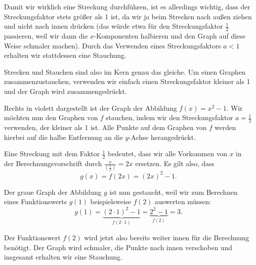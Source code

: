 \documentclass[../../main.tex]{subfiles}
\begin{document}
Damit wir wirklich eine Streckung durchführen, ist es allerdings wichtig, dass der Streckungsfaktor stets größer als 1 ist, da wir ja beim Strecken nach außen ziehen und nicht nach innen drücken (das würde etwa für den Streckungsfaktor $\frac{1}{2}$ passieren, weil wir dann die $x$-Komponenten halbieren und den Graph auf diese Weise schmaler machen). Durch das Verwenden eines Streckungsfaktors $a<1$ erhalten wir stattdessen eine Stauchung.

Strecken und Stauchen sind also im Kern genau das gleiche. Um einen Graphen zusammenzustauchen, verwenden wir einfach einen Streckungsfaktor kleiner als 1 und der Graph wird zusammengedrückt.

\begin{example}
    Rechts in violett dargestellt ist der Graph der Abbildung $f(x)=x^2-1$.
    Wir möchten nun den Graphen von $f$ stauchen, indem wir den Streckungsfaktor $a=\frac{1}{2}$ verwenden, der kleiner als 1 ist. Alle Punkte auf dem Graphen von $f$ werden hierbei auf die halbe Entfernung an die $y$-Achse herangedrückt. 
    
    Eine Streckung mit dem Faktor $\frac{1}{2}$ bedeutet, dass wir alle Vorkommen von $x$ in der Berechnungsvorschrift durch $\frac{x}{(\frac{1}{2})}=2x$ ersetzen. Es gilt also, dass \[g(x) = f(2x) = (2x)^2 - 1.\]
    
    Der graue Graph der Abbildung $g$ ist nun gestaucht, weil wir zum Berechnen eines Funktionswerts $g(1)$ beispielsweise $f(2)$ auswerten müssen: \[g(1)=\underbrace{(2\cdot 1)^2-1}_{f(2\cdot 1)}=\underbrace{2^2-1}_{f(2)}=3.\]
    
    Der Funktionswert $f(2)$ wird jetzt also bereits weiter innen für die Berechnung benötigt. Der Graph wird schmaler, die Punkte nach innen verschoben und insgesamt erhalten wir eine Stauchung.
\end{example}
\end{document}
